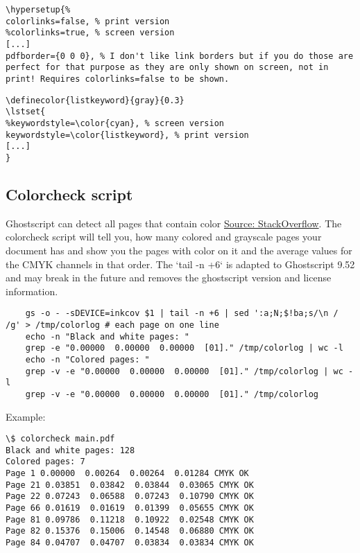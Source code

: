 \begin{lstlisting}
\hypersetup{%
colorlinks=false, % print version
%colorlinks=true, % screen version
[...]
pdfborder={0 0 0}, % I don't like link borders but if you do those are perfect for that purpose as they are only shown on screen, not in print! Requires colorlinks=false to be shown.
\end{lstlisting}

\begin{lstlisting}
\definecolor{listkeyword}{gray}{0.3}
\lstset{
%keywordstyle=\color{cyan}, % screen version
keywordstyle=\color{listkeyword}, % print version
[...]
}
\end{lstlisting}
  
\subsection{Colorcheck script}
Ghostscript can detect all pages that contain color \href{https://tex.stackexchange.com/questions/53493/detecting-all-pages-which-contain-color/61216\#61216}{Source: StackOverflow}.
The colorcheck script will tell you, how many colored and grayscale pages your document has and show you the pages with color on it and the average values for the CMYK channels in that order.
The `tail -n +6` is adapted to Ghostscript 9.52 and may break in the future and removes the ghostscript version and license information.

\begin{lstlisting}
    gs -o - -sDEVICE=inkcov $1 | tail -n +6 | sed ':a;N;$!ba;s/\n / /g' > /tmp/colorlog # each page on one line
    echo -n "Black and white pages: "
    grep -e "0.00000  0.00000  0.00000  [01]." /tmp/colorlog | wc -l
    echo -n "Colored pages: "
    grep -v -e "0.00000  0.00000  0.00000  [01]." /tmp/colorlog | wc -l
    grep -v -e "0.00000  0.00000  0.00000  [01]." /tmp/colorlog
\end{lstlisting}

Example:

\begin{lstlisting}
\$ colorcheck main.pdf
Black and white pages: 128
Colored pages: 7
Page 1 0.00000  0.00264  0.00264  0.01284 CMYK OK
Page 21 0.03851  0.03842  0.03844  0.03065 CMYK OK
Page 22 0.07243  0.06588  0.07243  0.10790 CMYK OK
Page 66 0.01619  0.01619  0.01399  0.05655 CMYK OK
Page 81 0.09786  0.11218  0.10922  0.02548 CMYK OK
Page 82 0.15376  0.15006  0.14548  0.06880 CMYK OK
Page 84 0.04707  0.04707  0.03834  0.03834 CMYK OK
\end{lstlisting}

